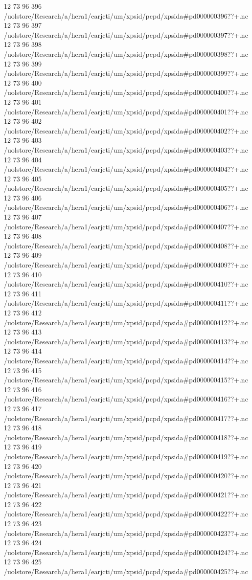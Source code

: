 12 73 96
396
/uolstore/Research/a/hera1/earjcti/um/xpsid/pcpd/xpsida#pd000000396??+.nc
12 73 96
397
/uolstore/Research/a/hera1/earjcti/um/xpsid/pcpd/xpsida#pd000000397??+.nc
12 73 96
398
/uolstore/Research/a/hera1/earjcti/um/xpsid/pcpd/xpsida#pd000000398??+.nc
12 73 96
399
/uolstore/Research/a/hera1/earjcti/um/xpsid/pcpd/xpsida#pd000000399??+.nc
12 73 96
400
/uolstore/Research/a/hera1/earjcti/um/xpsid/pcpd/xpsida#pd000000400??+.nc
12 73 96
401
/uolstore/Research/a/hera1/earjcti/um/xpsid/pcpd/xpsida#pd000000401??+.nc
12 73 96
402
/uolstore/Research/a/hera1/earjcti/um/xpsid/pcpd/xpsida#pd000000402??+.nc
12 73 96
403
/uolstore/Research/a/hera1/earjcti/um/xpsid/pcpd/xpsida#pd000000403??+.nc
12 73 96
404
/uolstore/Research/a/hera1/earjcti/um/xpsid/pcpd/xpsida#pd000000404??+.nc
12 73 96
405
/uolstore/Research/a/hera1/earjcti/um/xpsid/pcpd/xpsida#pd000000405??+.nc
12 73 96
406
/uolstore/Research/a/hera1/earjcti/um/xpsid/pcpd/xpsida#pd000000406??+.nc
12 73 96
407
/uolstore/Research/a/hera1/earjcti/um/xpsid/pcpd/xpsida#pd000000407??+.nc
12 73 96
408
/uolstore/Research/a/hera1/earjcti/um/xpsid/pcpd/xpsida#pd000000408??+.nc
12 73 96
409
/uolstore/Research/a/hera1/earjcti/um/xpsid/pcpd/xpsida#pd000000409??+.nc
12 73 96
410
/uolstore/Research/a/hera1/earjcti/um/xpsid/pcpd/xpsida#pd000000410??+.nc
12 73 96
411
/uolstore/Research/a/hera1/earjcti/um/xpsid/pcpd/xpsida#pd000000411??+.nc
12 73 96
412
/uolstore/Research/a/hera1/earjcti/um/xpsid/pcpd/xpsida#pd000000412??+.nc
12 73 96
413
/uolstore/Research/a/hera1/earjcti/um/xpsid/pcpd/xpsida#pd000000413??+.nc
12 73 96
414
/uolstore/Research/a/hera1/earjcti/um/xpsid/pcpd/xpsida#pd000000414??+.nc
12 73 96
415
/uolstore/Research/a/hera1/earjcti/um/xpsid/pcpd/xpsida#pd000000415??+.nc
12 73 96
416
/uolstore/Research/a/hera1/earjcti/um/xpsid/pcpd/xpsida#pd000000416??+.nc
12 73 96
417
/uolstore/Research/a/hera1/earjcti/um/xpsid/pcpd/xpsida#pd000000417??+.nc
12 73 96
418
/uolstore/Research/a/hera1/earjcti/um/xpsid/pcpd/xpsida#pd000000418??+.nc
12 73 96
419
/uolstore/Research/a/hera1/earjcti/um/xpsid/pcpd/xpsida#pd000000419??+.nc
12 73 96
420
/uolstore/Research/a/hera1/earjcti/um/xpsid/pcpd/xpsida#pd000000420??+.nc
12 73 96
421
/uolstore/Research/a/hera1/earjcti/um/xpsid/pcpd/xpsida#pd000000421??+.nc
12 73 96
422
/uolstore/Research/a/hera1/earjcti/um/xpsid/pcpd/xpsida#pd000000422??+.nc
12 73 96
423
/uolstore/Research/a/hera1/earjcti/um/xpsid/pcpd/xpsida#pd000000423??+.nc
12 73 96
424
/uolstore/Research/a/hera1/earjcti/um/xpsid/pcpd/xpsida#pd000000424??+.nc
12 73 96
425
/uolstore/Research/a/hera1/earjcti/um/xpsid/pcpd/xpsida#pd000000425??+.nc
